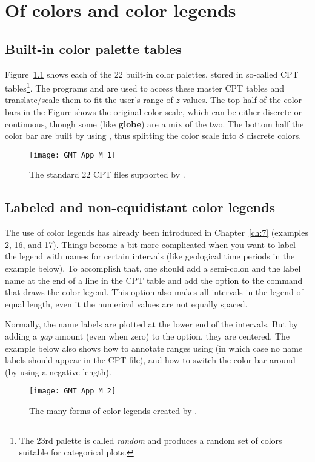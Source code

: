 %
%
\chapter{Of colors and color legends}
\label{app:M}
\section{Built-in color palette tables}
\thispagestyle{headings}

Figure~\ref{fig:GMT_App_M_1} shows each of the 22 built-in color palettes,
stored in so-called CPT tables\footnote{The 23rd palette is called \emph{random}
and produces a random set of colors suitable for categorical plots.}.
The programs  and  are used to access these master CPT tables
and translate/scale them to fit the user's range of $z$-values.
The top half of the color bars in the Figure shows the original color scale, which can be either discrete or
continuous, though some (like \textbf{globe}) are a mix of the two.
The bottom half the color bar are built by using
 , thus splitting the color scale into 8 discrete colors.

\begin{figure}[h]
\centering
\texttt{[image: GMT\_App\_M\_1]}
\caption{The standard 22 CPT files supported by \gmt.}
\label{fig:GMT_App_M_1}
\end{figure}

\section{Labeled and non-equidistant color legends}
\label{app:colorbars}
The use of color legends has already been introduced in Chapter~\ref{ch:7} (examples 2, 16, and 17). Things become a bit more complicated when you want to label the legend with names for certain intervals (like geological time periods in the example below). To accomplish that, one should add a semi-colon and the label name at the end of a line in the CPT table and add the  option to the  command that draws the color legend. This option also makes all intervals in the legend of equal length, even it the numerical values are not equally spaced.

Normally, the name labels are plotted at the lower end of the intervals. But by adding a \emph{gap} amount (even when zero) to the  option, they are centered. The example below also shows how to annotate ranges using  (in which case no name labels should appear in the CPT file), and how to switch the color bar around (by using a negative length).


\begin{figure}[h]
\centering
\texttt{[image: GMT\_App\_M\_2]}
\caption{The many forms of color legends created by \protect{}.}
\label{fig:GMT_App_M_2}
\end{figure}
